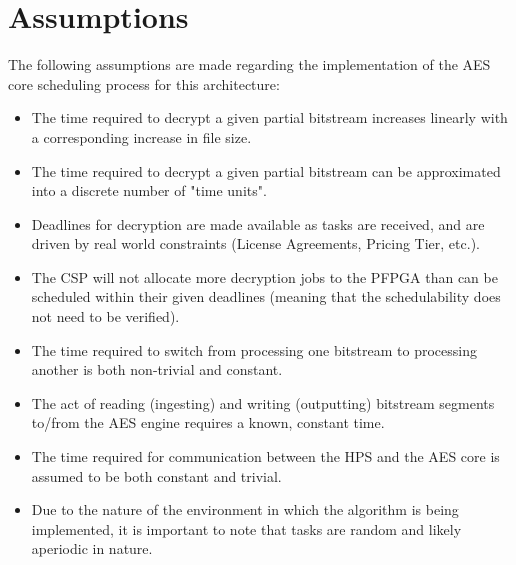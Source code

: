 \section{Assumptions}\label{subsec:EDFAssumptions}
The following assumptions are made regarding the implementation of the AES core scheduling process for this architecture:
\begin{itemize}
    \item The time required to decrypt a given partial bitstream increases linearly with a corresponding increase in file size.
    \item The time required to decrypt a given partial bitstream can be approximated into a discrete number of "time units".
    \item Deadlines for decryption are made available as tasks are received, and are driven by real world constraints (License Agreements, Pricing Tier, etc.).
    \item The CSP will not allocate more decryption jobs to the PFPGA than can be scheduled within their given deadlines (meaning that the schedulability does not need to be verified).
    \item The time required to switch from processing one bitstream to processing another is both non-trivial and constant.
    \item The act of reading (ingesting) and writing (outputting) bitstream segments to/from the AES engine requires a known, constant time.
    \item The time required for communication between the HPS and the AES core is assumed to be both constant and trivial.
    \item Due to the nature of the environment in which the algorithm is being implemented, it is important to note that tasks are random and likely aperiodic in nature.
\end{itemize}

